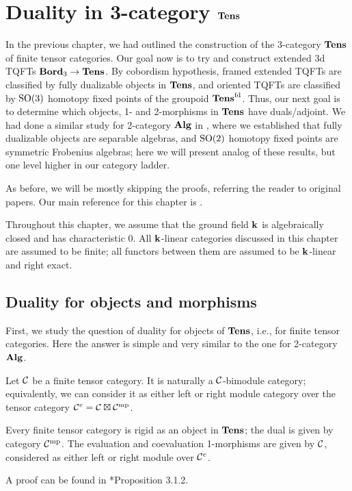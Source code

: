 \chapter{Duality in 3-category $\mathbf{Tens}$}\label{c:tens-dual}

In the previous chapter, we had outlined the construction of the 3-category
$\mathbf{Tens}$ of finite tensor categories. Our goal now is to try and construct
extended 3d TQFTs $\mathbf{Bord}_3\to \mathbf{Tens}$. By cobordism hypothesis, framed extended
TQFTs are classified by fully dualizable objects in $\mathbf{Tens}$, and oriented TQFTs
are classified by $\mathrm{SO}(3)$ homotopy fixed points of the groupoid $\mathbf{Tens}^{\mathrm{fd}}$.
Thus, our next goal is to determine which objects, 1- and 2-morphisms in
$\mathbf{Tens}$ have duals/adjoint. We had done a similar study for 2-category $\mathbf{Alg}$ in
, where we established that fully dualizable
objects are separable algebras, and $\mathrm{SO}(2)$ homotopy fixed points are symmetric
Frobenius algebras; here we will present analog of these results, but one level
higher in our category ladder.

As before, we will be mostly skipping the proofs, referring the reader to
original papers. Our main reference for this chapter is .

Throughout this chapter, we assume that the ground field $\mathbf{k}$ is algebraically
closed and has characteristic 0. All $\mathbf{k}$-linear categories discussed in this
chapter are assumed to be finite; all functors between them are assumed to be
$\mathbf{k}$-linear and right exact.

\section{Duality for objects and morphisms}\label{s:duality-obj-mor}

First, we study the question of duality for objects of $\mathbf{Tens}$, i.e., for finite
tensor categories. Here the answer is simple and very similar to the one for
2-category $\mathbf{Alg}$.

Let $\mathcal{C}$ be a finite tensor category. It is naturally a $\mathcal{C}$-bimodule
category; equivalently, we can consider it as either left or right module
category over the tensor category $\mathcal{C}^e=\mathcal{C}\boxtimes\mathcal{C}^{\mathrm{mp}}$.

\begin{theorem}\label{t:tens-rigid}
  Every finite tensor category is rigid as an object in $\mathbf{Tens}$; the dual is
  given by category $\mathcal{C}^{\mathrm{mp}}$. The evaluation and coevaluation 1-morphisms
  are given by $\mathcal{C}$, considered as either left or right module over
  $\mathcal{C}^e$.
\end{theorem}
A proof can be found in *{Proposition 3.1.2}.

